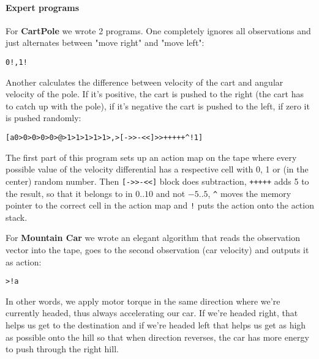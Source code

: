 \paragraph{Expert programs}
\label{sec:expert-progs}

For \textbf{CartPole} we wrote 2 programs. 
One completely ignores all observations and just alternates between "move right" and "move left":

\begin{center}
\begin{lstlisting}
0!,1!
\end{lstlisting}
\end{center}

Another calculates the difference between velocity of the cart and angular velocity of the pole.
If it's positive, the cart is pushed to the right (the cart has to catch up with the pole), if it's negative the cart is pushed to the left, if zero it is pushed randomly:

\begin{center}
\begin{lstlisting}
[a0>0>0>0>0>@>1>1>1>1>1>,>[->>-<<]>>+++++^!1]
\end{lstlisting}
\end{center}

The first part of this program sets up an action map on the tape where every possible value of the velocity differential has a respective cell with 0, 1 or (in the center) random number.
Then \verb|[->>-<<]| block does subtraction, \verb|+++++| adds 5 to the result, so that it belongs to in $0..10$ and not $-5..5$, \verb|^| moves the memory pointer to the correct cell in the action map and \verb|!| puts the action onto the action stack.

For \textbf{Mountain Car} we wrote an elegant algorithm that reads the observation vector into the tape, goes to the second observation (car velocity) and outputs it as action:

\begin{center}
\begin{lstlisting}
>!a
\end{lstlisting}
\end{center}

In other words, we apply motor torque in the same direction where we're currently headed, thus always accelerating our car.
If we're headed right, that helps us get to the destination and if we're headed left that helps us get as high as possible onto the hill so that when direction reverses, the car has more energy to push through the right hill.

